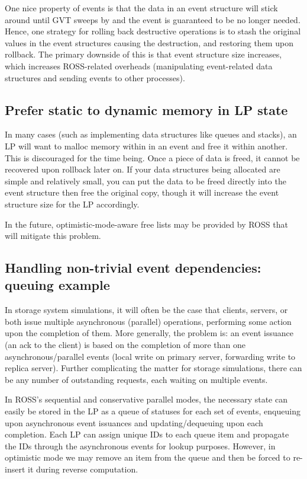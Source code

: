 \documentclass[conference,10pt,compsocconf,onecolumn]{IEEEtran}
\begin{document}
One nice property of events is that the data in an event structure will stick
around until GVT sweeps by and the event is guaranteed to be no longer needed.
Hence, one strategy for rolling back destructive operations is to stash the
original values in the event structures causing the destruction, and restoring
them upon rollback. The primary downside of this is that event structure size
increases, which increases ROSS-related overheads (manipulating event-related
data structures and sending events to other processes).

\subsection{Prefer static to dynamic memory in LP state}

In many cases (such as implementing data structures like queues and stacks), an
LP will want to malloc memory within in an event and free it within another.
This is discouraged for the time being. Once a piece of data is freed, it
cannot be recovered upon rollback later on. If your data structures being
allocated are simple and relatively small, you can put the data to be freed
directly into the event structure then free the original copy, though it will
increase the event structure size for the LP accordingly.

In the future, optimistic-mode-aware free lists may be provided by ROSS that
will mitigate this problem.

\subsection{Handling non-trivial event dependencies: queuing example}

In storage system simulations, it will often be the case that clients, servers,
or both issue multiple asynchronous (parallel) operations, performing some
action upon the completion of them. More generally, the problem is: an event
issuance (an ack to the client) is based on the completion of more than one
asynchronous/parallel events (local write on primary server, forwarding write to
replica server). Further complicating the matter for storage simulations, there
can be any number of outstanding requests, each waiting on multiple events. 

In ROSS's sequential and conservative parallel modes, the necessary state can
easily be stored in the LP as a queue of statuses for each set of events,
enqueuing upon asynchronous event issuances and updating/dequeuing upon each
completion. Each LP can assign unique IDs to each queue item and propagate the
IDs through the asynchronous events for lookup purposes. However, in optimistic
mode we may remove an item from the queue and then be forced to re-insert it
during reverse computation.
\end{document}
